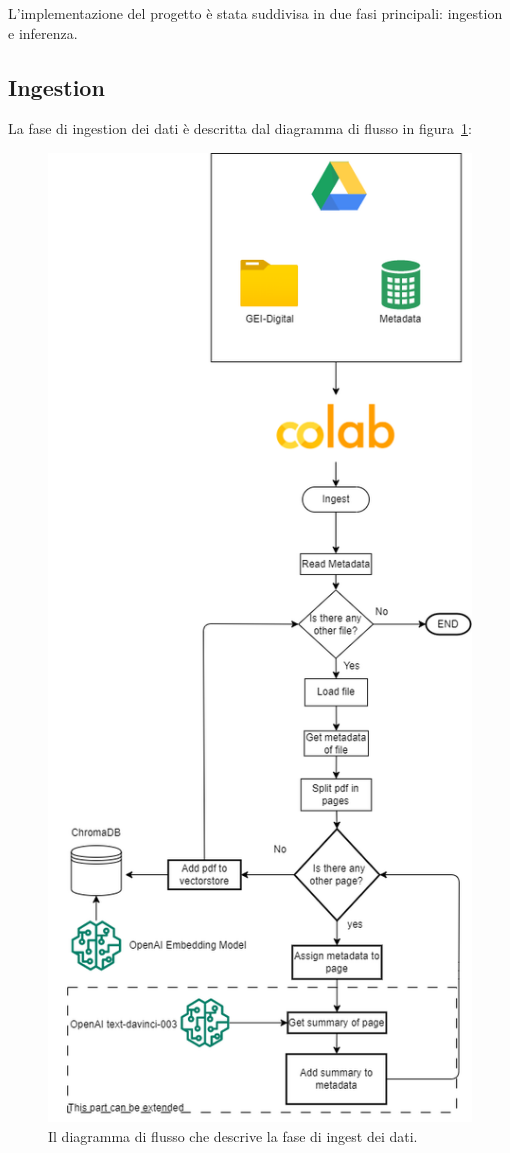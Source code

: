 L'implementazione del progetto è stata suddivisa in due fasi principali: ingestion e inferenza.

\subsection{Ingestion} 
La fase di ingestion dei dati è descritta dal diagramma di flusso in figura~\ref{fig:ingest}:
\begin{figure}[H]
    \centering
    \includegraphics[height=0.5\pdfpageheight]{images/ingest.png}
    \caption[Ingestion]{Il diagramma di flusso che descrive la fase di ingest dei dati.}
    \label{fig:ingest}
\end{figure}

